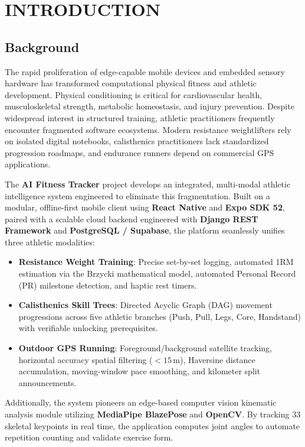 \documentclass[12pt,a4paper]{report}
\begin{document}
\chapter{INTRODUCTION}

\section{Background}
The rapid proliferation of edge-capable mobile devices and embedded sensory hardware has transformed computational physical fitness and athletic development. Physical conditioning is critical for cardiovascular health, musculoskeletal strength, metabolic homeostasis, and injury prevention. Despite widespread interest in structured training, athletic practitioners frequently encounter fragmented software ecosystems. Modern resistance weightlifters rely on isolated digital notebooks, calisthenics practitioners lack standardized progression roadmaps, and endurance runners depend on commercial GPS applications.

The \textbf{AI Fitness Tracker} project develops an integrated, multi-modal athletic intelligence system engineered to eliminate this fragmentation. Built on a modular, offline-first mobile client using \textbf{React Native} and \textbf{Expo SDK 52}, paired with a scalable cloud backend engineered with \textbf{Django REST Framework} and \textbf{PostgreSQL / Supabase}, the platform seamlessly unifies three athletic modalities:
\begin{itemize}
    \item \textbf{Resistance Weight Training}: Precise set-by-set logging, automated 1RM estimation via the Brzycki mathematical model, automated Personal Record (PR) milestone detection, and haptic rest timers.
    \item \textbf{Calisthenics Skill Trees}: Directed Acyclic Graph (DAG) movement progressions across five athletic branches (Push, Pull, Legs, Core, Handstand) with verifiable unlocking prerequisites.
    \item \textbf{Outdoor GPS Running}: Foreground/background satellite tracking, horizontal accuracy spatial filtering ($<15$\,m), Haversine distance accumulation, moving-window pace smoothing, and kilometer split announcements.
\end{itemize}

Additionally, the system pioneers an edge-based computer vision kinematic analysis module utilizing \textbf{MediaPipe BlazePose} and \textbf{OpenCV}. By tracking 33 skeletal keypoints in real time, the application computes joint angles to automate repetition counting and validate exercise form.
\end{document}
